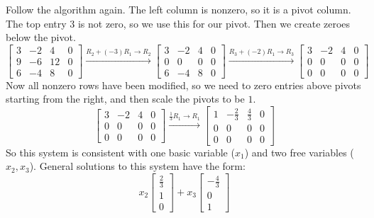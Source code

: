 \documentclass[12pt,letterpaper]{article}
\begin{document}
\begin{enumerate}
  \Answer
  Follow the algorithm again. The left column is nonzero, so it is a pivot column. The top entry $3$ is not zero, so we use this for our pivot. Then we create zeroes below the pivot.
  \[
    \left[
      \begin{array}{ccc|c}
        3&-2&4&0\\
        9&-6&12&0\\
        6&-4&8&0
      \end{array}
    \right]\xrightarrow{R_2+(-3)R_1\rightarrow R_2}
    \left[
      \begin{array}{ccc|c}
        3&-2&4&0\\
        0&0&0&0\\
        6&-4&8&0
      \end{array}
    \right]\xrightarrow{R_3+(-2)R_1\rightarrow R_3}
    \left[
      \begin{array}{ccc|c}
        3&-2&4&0\\
        0&0&0&0\\
        0&0&0&0
      \end{array}
    \right]
  \]
  Now all nonzero rows have been modified, so we need to zero entries above pivots starting from the right, and then scale the pivots to be $1$.
  \[
    \left[
      \begin{array}{ccc|c}
        3&-2&4&0\\
        0&0&0&0\\
        0&0&0&0
      \end{array}
    \right]\xrightarrow{\frac{1}{3}R_1\rightarrow R_1}
    \left[
      \begin{array}{ccc|c}
        1&-\frac{2}{3}&\frac{4}{3}&0\\
        0&0&0&0\\
        0&0&0&0
      \end{array}
    \right]
  \]
  So this system is consistent with one basic variable ($x_1$) and two free variables ($x_2,x_3$). General solutions to this system have the form:
  \[
    x_2\left[
      \begin{array}{c}
        \frac{2}{3}\\
        1\\
        0
      \end{array}
    \right]+
    x_3\left[
      \begin{array}{c}
        -\frac{4}{3}\\
        0\\
        1
      \end{array}
    \right]
  \]


\end{enumerate}
\end{document}
